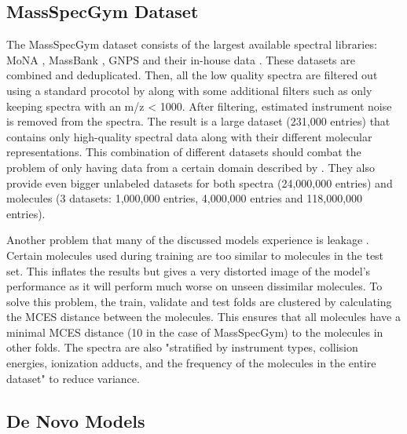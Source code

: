 \subsection{MassSpecGym Dataset}
\label{subsec:massspecgymdataset}
The MassSpecGym dataset consists of the largest available spectral libraries: MoNA \cite{mona}, MassBank \cite{horai2010massbank}, GNPS \cite{wang2016sharing} and their in-house data \cite{brungs2024efficient}.
These datasets are combined and deduplicated.
Then, all the low quality spectra are filtered out using a standard procotol by \textcite{de2023reproducible} along with some additional filters such as only keeping spectra with an m/z < 1000. After filtering, estimated instrument noise is removed from the spectra. The result is a large dataset (231,000 entries) that contains only high-quality spectral data along with their different molecular representations. This combination of different datasets should combat the problem of only having data from a certain domain described by \textcite{kretschmer2023small}. They also provide even bigger unlabeled datasets for both spectra (24,000,000 entries) and molecules (3 datasets: 1,000,000 entries, 4,000,000 entries and 118,000,000 entries).

Another problem that many of the discussed models experience is leakage \cite{bushuiev2024massspecgym}. Certain molecules used during training are too similar to molecules in the test set. This inflates the results but gives a very distorted image of the model's performance as it will perform much worse on unseen dissimilar molecules. To solve this problem, the train, validate and test folds are clustered by calculating the \ac{MCES} distance between the molecules. This ensures that all molecules have a minimal \ac{MCES} distance (10 in the case of MassSpecGym) to the molecules in other folds. The spectra are also "stratified by instrument types, collision energies, ionization adducts, and the frequency of the molecules in the entire dataset" \cite{bushuiev2024massspecgym} to reduce variance.

\subsection{De Novo Models}
\label{subsec:massspecgymmodels}

